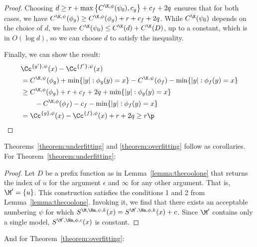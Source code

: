 \begin{proof}
Choosing $d \geq r + \max \left\{C^{\K,\phi}(\psi_0), c_g \right\} + c_f + 2q$ ensures that for both cases, we have $C^{\K, \psi}(\phi_g) \geq C^{\K, \phi}(\phi_g) + r + c_f + 2q$. While $C^\K(\psi_0)$ depends on the choice of $d$, we have $C^\K(\psi_0) \leq C^\K(d) + C^\K(D)$, up to a constant, which is in $O(\log d)$, so we can choose $d$ to satisfy the inequality.  

Finally, we can show the result: \belowdisplayskip=-26pt
\begin{align*}
&\Cc^{\{g'\}, \psi}(x) - \Cc^{\{f'\}, \psi}(x)\\
&=C^{\K, \psi}(\phi_g) + \min\{|y| : \phi_g(y) = x\} - C^{\K, \psi}(\phi_f) - \min\{|y| : \phi_f(y) = x\}\\
&\geq C^{\K, \phi}(\phi_g) + r + c_f + 2q + \min\{|y| : \phi_g(y) = x\} \\
&\quad\quad- C^{\K, \phi}(\phi_f) - c_f - \min\{|y| : \phi_f(y) = x\} \\
&= \Cc^{\{g\}, \phi}(x) - \Cc^{\{f\}, \phi}(x) + r + 2q\geq r \p\\
\end{align*}
\end{proof}
Theorems~\ref{theorem:underfitting} and \ref{theorem:overfitting} follow as corollaries. For Theorem~\ref{theorem:underfitting}:
\begin{proof}
Let $D$ be a prefix function as in Lemma~\ref{lemma:thecoolone} that returns the index of $u$ for the argument $\epsilon$ and $\infty$ for any other argument. That is, $\M' = \{u\}$. This construction satisfies the conditions 1 and 2 from Lemma~\ref{lemma:thecoolone}. Invoking it, we find that there exists an acceptable numbering $\psi$ for which $S^{\M,\Nm,\psi,k}(x) = S^{\M',\Nm,\phi,k}(x) + c$. Since $\M'$ contains only a single model, $S^{\M',\Nm,\phi, c}(x)$ is constant.
\end{proof}
And for Theorem~\ref{theorem:overfitting}:

